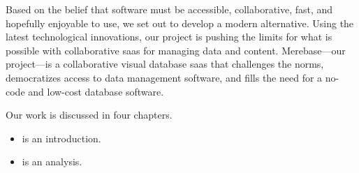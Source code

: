 Based on the belief that software must be accessible, collaborative, fast, and hopefully enjoyable to use, we set out to develop a modern alternative. Using the latest technological innovations, our project is pushing the limits for what is possible with collaborative \acrshort{saas} for managing data and content. Merebase---our project---is a collaborative visual database \acrshort{saas} that challenges the norms, democratizes access to data management software, and fills the need for a no-code and low-cost database software.

Our work is discussed in four chapters.
\begin{itemize}
	\item {} is an introduction.
	\item {} is an analysis.
\end{itemize}